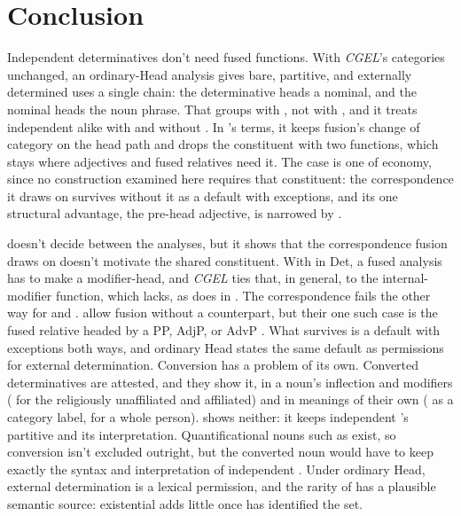 \documentclass[12pt]{article}
\begin{document}
\section{Conclusion}\label{sec:conclusion}

Independent determinatives don't need fused functions. With \textit{CGEL}'s categories unchanged, an ordinary-Head analysis gives bare, partitive, and externally determined uses a single chain: the determinative heads a nominal, and the nominal heads the noun phrase. That groups  with , not with , and it treats independent  alike with and without . In \citeauthor{Payne2007}'s terms, it keeps fusion's change of category on the head path and drops the constituent with two functions, which stays where adjectives and fused relatives need it. The case is one of economy, since no construction examined here requires that constituent: the correspondence it draws on survives without it as a default with exceptions, and its one structural advantage, the pre-head adjective, is narrowed by .

 doesn't decide between the analyses, but it shows that the correspondence fusion draws on doesn't motivate the shared constituent. With  in Det, a fused analysis has to make  a modifier-head, and \textit{CGEL} ties that, in general, to the internal-modifier function, which  lacks, as  does in  \citep[377]{huddleston2002}. The correspondence fails the other way for  and  \citep[416]{huddleston2002}. \textcite[570]{Payne2007} allow fusion without a counterpart, but their one such case is the fused relative headed by a PP, AdjP, or AdvP \citep[575]{Payne2007}. What survives is a default with exceptions both ways, and ordinary Head states the same default as permissions for external determination.
Conversion has a problem of its own. Converted determinatives are attested, and they show it, in a noun's inflection and modifiers ( for the religiously unaffiliated and affiliated) and in meanings of their own ( as a category label,  for a whole person).  shows neither: it keeps independent 's partitive and its interpretation. Quantificational nouns such as  exist, so conversion isn't excluded outright, but the converted noun would have to keep exactly the syntax and interpretation of independent . Under ordinary Head, external determination is a lexical permission, and the rarity of  has a plausible semantic source: existential  adds little once  has identified the set.
\end{document}
